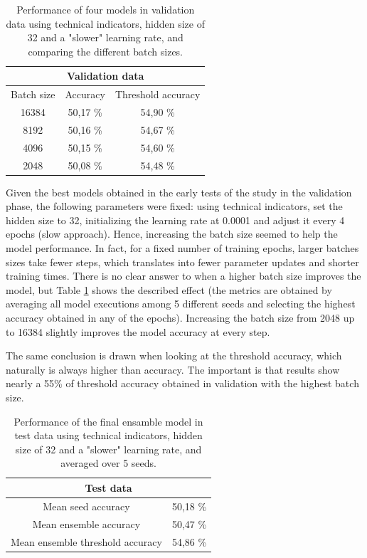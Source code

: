 \documentclass[10pt,twocolumn,letterpaper]{article}
\begin{document}
\begin{table}[h]
\begin{center}
\begin{tabular}{ccc}
    \multicolumn{3}{c}{Validation data} \\
    \toprule
    Batch size & Accuracy & Threshold accuracy \\
    \toprule
    16384 & 50,17 \% & \cellcolor{lightgray}54,90 \% \\
    8192 & 50,16  \% & \cellcolor{lightgray}54,67 \% \\
    4096 & 50,15  \% & \cellcolor{lightgray}54,60 \% \\
    2048 & 50,08  \% & \cellcolor{lightgray}54,48 \% \\
    \bottomrule
    \end{tabular}
\end{center}
   \caption{Performance of four models in validation data using technical indicators, hidden size of 32 and a "slower" learning rate, and comparing the different batch sizes.}
\label{batch_models}
\end{table}

Given the best models obtained in the early tests of the study in the validation phase, the following parameters were fixed: using technical indicators, set the hidden size to 32, initializing the learning rate at 0.0001 and adjust it every 4 epochs (slow approach). Hence, increasing the batch size seemed to help the model performance. In fact, for a fixed number of training epochs, larger batches sizes take fewer steps, which translates into fewer parameter updates and shorter training times. There is no clear answer to when a higher batch size improves the model, but Table \ref{batch_models} shows the described effect (the metrics are obtained by averaging all model executions among 5 different seeds and selecting the highest accuracy obtained in any of the epochs). Increasing the batch size from 2048 up to 16384 slightly improves the model accuracy at every step.

The same conclusion is drawn when looking at the threshold accuracy, which naturally is always higher than accuracy. The important is that results show nearly a 55\% of threshold accuracy obtained in validation with the highest batch size.

\begin{table}[h]
\begin{center}
\begin{tabular}{cc}
    \multicolumn{2}{c}{Test data} \\
    \toprule
    Mean seed accuracy & 50,18 \% \\
    Mean ensemble accuracy & 50,47 \% \\
    \cellcolor{lightgray} Mean ensemble threshold accuracy & \cellcolor{lightgray}54,86 \% \\
    \bottomrule
    \end{tabular}
\end{center}
   \caption{Performance of the final ensamble model in test data using technical indicators, hidden size of 32 and a "slower" learning rate, and averaged over 5 seeds.}
\label{best_model}
\end{table}
\end{document}

